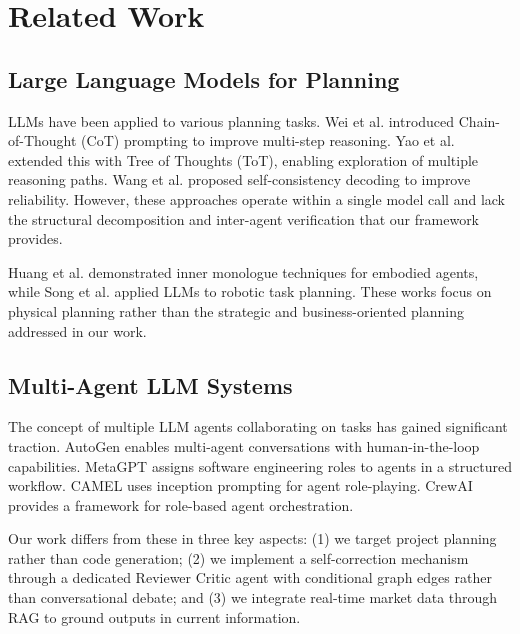 \documentclass[journal]{IEEEtran}
\begin{document}
\section{Related Work}
\label{sec:related}

\subsection{Large Language Models for Planning}

LLMs have been applied to various planning tasks. Wei et al. \cite{wei2022chain} introduced Chain-of-Thought (CoT) prompting to improve multi-step reasoning. Yao et al. \cite{yao2023tree} extended this with Tree of Thoughts (ToT), enabling exploration of multiple reasoning paths. Wang et al. \cite{wang2023selfconsistency} proposed self-consistency decoding to improve reliability. However, these approaches operate within a single model call and lack the structural decomposition and inter-agent verification that our framework provides.

Huang et al. \cite{huang2023inner} demonstrated inner monologue techniques for embodied agents, while Song et al. \cite{song2023llmplanner} applied LLMs to robotic task planning. These works focus on physical planning rather than the strategic and business-oriented planning addressed in our work.

\subsection{Multi-Agent LLM Systems}

The concept of multiple LLM agents collaborating on tasks has gained significant traction. AutoGen \cite{wu2023autogen} enables multi-agent conversations with human-in-the-loop capabilities. MetaGPT \cite{hong2023metagpt} assigns software engineering roles to agents in a structured workflow. CAMEL \cite{li2023camel} uses inception prompting for agent role-playing. CrewAI \cite{crewai2024} provides a framework for role-based agent orchestration.

Our work differs from these in three key aspects: (1) we target project planning rather than code generation; (2) we implement a self-correction mechanism through a dedicated Reviewer Critic agent with conditional graph edges rather than conversational debate; and (3) we integrate real-time market data through RAG to ground outputs in current information.
\end{document}
